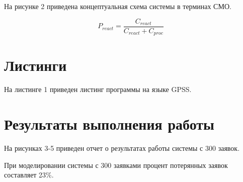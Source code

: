 На рисунке 2 приведена концептуальная схема системы в терминах СМО.

$$
P_{react} = \frac{C_{react}}{C_{react} + C_{proc}}
$$



\section*{Листинги}


На листинге 1 приведен листинг программы на языке GPSS.







\section*{Результаты выполнения работы}

На рисунках 3-5 приведен отчет о результатах работы системы с 300 заявок.


При моделировании системы с 300 заявками процент потерянных заявок составляет 23\%.








